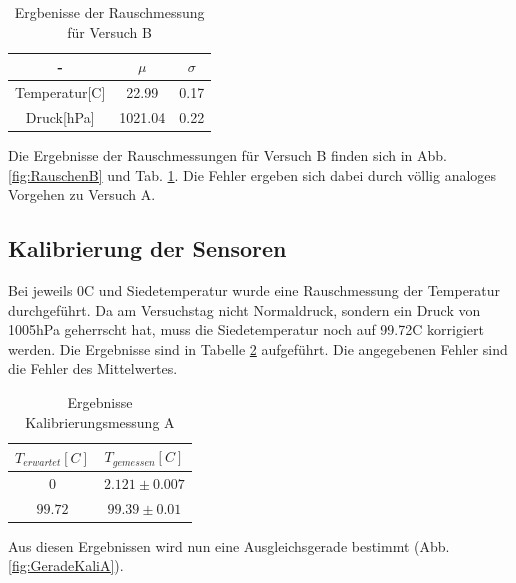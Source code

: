 \documentclass[12pt,a4paper]{article}
\begin{document}
\begin{table}[H]
\begin{center}
\begin{tabular}{|c|c|c|}
\hline 
- & $\mu$ & $\sigma$\\ 
\hline 
Temperatur[C] & 22.99 & 0.17 \\ 
\hline 
Druck[hPa] & 1021.04 & 0.22\\ 
\hline 
\end{tabular}
\caption[Tabelle Rauschenmessung B]{Ergbenisse der Rauschmessung für Versuch B}
\label{tab:RauschenB}
\end{center}
\end{table}

Die Ergebnisse der Rauschmessungen für Versuch B finden sich in Abb. \ref{fig:RauschenB} und Tab. \ref{tab:RauschenB}. Die Fehler ergeben sich dabei durch völlig analoges Vorgehen zu Versuch A.



\subsection{Kalibrierung der Sensoren}

Bei jeweils 0C und Siedetemperatur wurde eine Rauschmessung der Temperatur durchgeführt. Da am Versuchstag nicht Normaldruck, sondern ein Druck von 1005hPa geherrscht hat, muss die Siedetemperatur noch auf 99.72C korrigiert werden. Die Ergebnisse sind in Tabelle \ref{tab:KaliA} aufgeführt. Die angegebenen Fehler sind die Fehler des Mittelwertes.

\begin{table}[H]
\begin{center}
\begin{tabular}{|c|c|}
\hline 
$T_{erwartet}[C]$ & $T_{gemessen}[C]$ \\ 
\hline 
$0$ & $2.121\pm0.007$ \\ %
\hline 
$99.72$ & $99.39\pm0.01$ \\ 
\hline 
\end{tabular}
\caption[Ergebnisse Kalibrierungsmessung A]{Ergebnisse Kalibrierungsmessung A} 
\label{tab:KaliA}
\end{center}
\end{table}

Aus diesen Ergebnissen wird nun eine Ausgleichsgerade bestimmt (Abb.\ref{fig:GeradeKaliA}).
\end{document}
